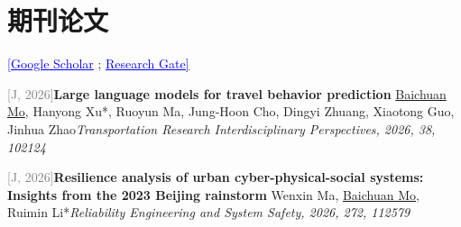 \section{期刊论文}
{\small{\href{https://scholar.google.com/citations?user=ORhrfXoAAAAJ&hl=en}{\textcolor{blue}{\underline{[Google Scholar}}}}\; ; \;}{\small{\href{https://www.researchgate.net/profile/Baichuan-Mo}{\textcolor{blue}{\underline{Research Gate]}}}}}

\vspace{7pt}

\par\noindent\begin{minipage}{\linewidth}
{\textcolor{gray}{[J\themyCounter, 2026]\;}}{\textbf{Large language models for travel behavior prediction} \href{https://doi.org/10.1016/j.trip.2026.102124}{\textcolor{cadmiumorange}{\faExternalLink}}}{\newline \underline{Baichuan Mo}, Hanyong Xu*, Ruoyun Ma, Jung-Hoon Cho, Dingyi Zhuang, Xiaotong Guo, Jinhua Zhao}{\newline \emph{Transportation Research Interdisciplinary Perspectives, 2026, 38, 102124}}{{\;    }}{}
\end{minipage}\par\vspace{5.5pt}


\par\noindent\begin{minipage}{\linewidth}
{\textcolor{gray}{[J\themyCounter, 2026]\;}}{\textbf{Resilience analysis of urban cyber-physical-social systems: Insights from the 2023 Beijing rainstorm} \href{https://doi.org/10.1016/j.ress.2026.112579}{\textcolor{cadmiumorange}{\faExternalLink}}}{\newline Wenxin Ma, \underline{Baichuan Mo}, Ruimin Li*}{\newline \emph{Reliability Engineering and System Safety, 2026, 272, 112579}}{{\;     }}{}
\end{minipage}\par\vspace{5.5pt}


